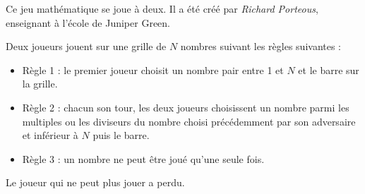 \Recreation


   Ce jeu mathématique se joue à deux. Il a été créé par {\it Richard Porteous}, enseignant à l'école de Juniper Green. \bigskip
   
      Deux joueurs jouent sur une grille de $N$ nombres suivant les règles suivantes :
      \begin{itemize}
         \item Règle 1 : le premier joueur choisit un nombre pair entre 1 et $N$ et le barre sur la grille.
         \item Règle 2 : chacun son tour, les deux joueurs choisissent un nombre parmi les multiples ou les diviseurs du nombre choisi précédemment par son adversaire et inférieur à $N$ puis le barre.
         \item Règle 3 : un nombre ne peut être joué qu'une seule fois.
      \end{itemize}
      Le joueur qui ne peut plus jouer a perdu. \\
      
